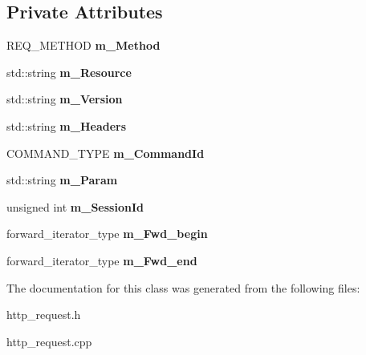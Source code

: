 \subsection*{\-Private \-Attributes}
\begin{DoxyCompactItemize}
\item 
\hypertarget{classhttp__server_1_1cRequest_a4702912c2025f7ce153f9ac68567b55c}{\-R\-E\-Q\-\_\-\-M\-E\-T\-H\-O\-D {\bfseries m\-\_\-\-Method}}\label{classhttp__server_1_1cRequest_a4702912c2025f7ce153f9ac68567b55c}

\item 
\hypertarget{classhttp__server_1_1cRequest_a4bd223196a1aa78de6ff2de4202232fa}{std\-::string {\bfseries m\-\_\-\-Resource}}\label{classhttp__server_1_1cRequest_a4bd223196a1aa78de6ff2de4202232fa}

\item 
\hypertarget{classhttp__server_1_1cRequest_ab64ead387c97768aabc1bed343731153}{std\-::string {\bfseries m\-\_\-\-Version}}\label{classhttp__server_1_1cRequest_ab64ead387c97768aabc1bed343731153}

\item 
\hypertarget{classhttp__server_1_1cRequest_aa1e6a65858e9cf26432add99470e4104}{std\-::string {\bfseries m\-\_\-\-Headers}}\label{classhttp__server_1_1cRequest_aa1e6a65858e9cf26432add99470e4104}

\item 
\hypertarget{classhttp__server_1_1cRequest_a2481a39733ba13124de865b30598a310}{\-C\-O\-M\-M\-A\-N\-D\-\_\-\-T\-Y\-P\-E {\bfseries m\-\_\-\-Command\-Id}}\label{classhttp__server_1_1cRequest_a2481a39733ba13124de865b30598a310}

\item 
\hypertarget{classhttp__server_1_1cRequest_a5320d5862827483c3f72c4fb385bcb16}{std\-::string {\bfseries m\-\_\-\-Param}}\label{classhttp__server_1_1cRequest_a5320d5862827483c3f72c4fb385bcb16}

\item 
\hypertarget{classhttp__server_1_1cRequest_a9c32df40a547799225a5ec41099fde53}{unsigned int {\bfseries m\-\_\-\-Session\-Id}}\label{classhttp__server_1_1cRequest_a9c32df40a547799225a5ec41099fde53}

\item 
\hypertarget{classhttp__server_1_1cRequest_a346ff4a99509f28178aa3702a877d438}{forward\-\_\-iterator\-\_\-type {\bfseries m\-\_\-\-Fwd\-\_\-begin}}\label{classhttp__server_1_1cRequest_a346ff4a99509f28178aa3702a877d438}

\item 
\hypertarget{classhttp__server_1_1cRequest_ad9fb0f78ed6fca01cdcdc6b3b01ba519}{forward\-\_\-iterator\-\_\-type {\bfseries m\-\_\-\-Fwd\-\_\-end}}\label{classhttp__server_1_1cRequest_ad9fb0f78ed6fca01cdcdc6b3b01ba519}

\end{DoxyCompactItemize}


\-The documentation for this class was generated from the following files\-:\begin{DoxyCompactItemize}
\item 
http\-\_\-request.\-h\item 
http\-\_\-request.\-cpp\end{DoxyCompactItemize}
